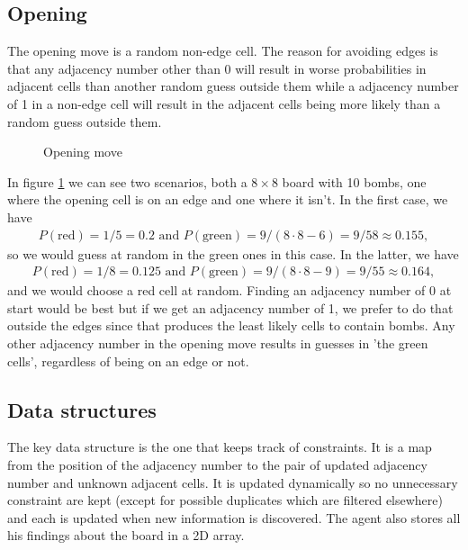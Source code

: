 \documentclass[11pt,a4paper,notitlepage]{article}
\theoremstyle{definition}
\begin{document}
\subsection{Opening}%
The opening move is a random non-edge cell. The reason for avoiding edges is that any adjacency number other than 0 will result in worse probabilities in adjacent cells than another random guess outside them while a adjacency number of 1 in a non-edge cell will result in the adjacent cells being more likely than a random guess outside them.
\begin{figure}[H]
\begin{center}
\hspace{1cm}
\end{center}
\caption{Opening move}
\label{fig:open}
\end{figure}
In figure \ref{fig:open} we can see two scenarios, both a $8\times 8$ board with 10 bombs, one where the opening cell is on an edge and one where it isn't. In the first case, we have 
\begin{align*}
P(\text{red}) = 1/5 = 0.2 \text{ and } P(\text{green}) = 9 / (8 \cdot 8 - 6) = 9/58 \approx 0.155,
\end{align*}
so we would guess at random in the green ones in this case. In the latter, we have
\begin{align*}
P(\text{red}) = 1/8 = 0.125 \text{ and } P(\text{green}) = 9/ (8 \cdot 8 - 9) = 9/55 \approx 0.164, 
\end{align*}
and we would choose a red cell at random. Finding an adjacency number of 0 at start would be best but if we get an adjacency number of 1, we prefer to do that outside the edges since that produces the least likely cells to contain bombs. Any other adjacency number in the opening move results in guesses in 'the green cells', regardless of being on an edge or not.\\

\subsection{Data structures}
The key data structure is the one that keeps track of constraints. It is a map from the position of the adjacency number to the pair of updated adjacency number and unknown adjacent cells. It is updated dynamically so no unnecessary constraint are kept (except for possible duplicates which are filtered elsewhere) and each is updated when new information is discovered. The agent also stores all his findings about the board in a 2D array.\\
\end{document}
